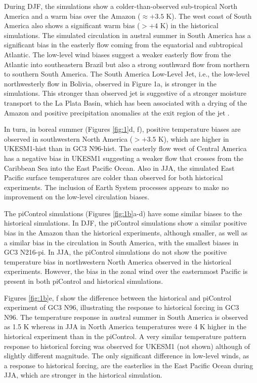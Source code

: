  During DJF, the simulations show a colder-than-observed sub-tropical North America and a warm bias over the Amazon ($\approx +3.5$ K).
 The west coast of South America also shows a significant warm bias ($>+4$ K) in the historical simulations.
 The simulated circulation in austral summer in South America has a significant bias in the easterly flow coming from the equatorial and subtropical Atlantic.
 The low-level wind biases suggest a weaker easterly flow from the Atlantic into southeastern Brazil but also a strong southward flow from northern to southern South America.
  The South America Low-Level Jet, i.e., the low-level northwesterly flow in Bolivia, observed in Figure 1a, is stronger in the simulations.
   This stronger than observed jet is suggestive of a stronger moisture transport to the La Plata Basin, which has been associated with a drying of the Amazon and positive precipitation anomalies at the exit region of the jet \citep{marengo2012,jones2017}.


In turn, in boreal summer (Figures \ref{fig:1}d, f), positive temperature biases are observed in southwestern North America ($>+3.5 $ K), which are higher in UKESM1-hist than in GC3 N96-hist.
 The easterly flow west of Central America has a negative bias in UKESM1 suggesting a weaker flow that crosses from the Caribbean Sea into the East Pacific Ocean.
 Also in JJA, the simulated East Pacific surface temperatures are colder than observed for both historical experiments.      The inclusion of Earth System processes appears to make no  improvement on the low-level circulation biases. 

The piControl simulations (Figures \ref{fig:1b}a-d) have some similar biases to the historical simulations.
 In DJF, the piControl simulations show a similar positive bias in the Amazon than the historical experiments, although smaller, as well as a similar bias in the circulation in South America, with the smallest biases in GC3 N216-pi.
 In JJA, the piControl simulations do not show the positive temperature bias in northwestern North America observed in the historical experiments. However, the bias in the zonal wind over the easternmost Pacific is present in both piControl and historical simulations.
 
 Figures \ref{fig:1b}e, f show the difference between the historical and piControl experiment of GC3 N96, illustrating the response to historical forcing in GC3 N96.
 The temperature response in austral summer in South America is observed as 1.5 K whereas in JJA in North America temperatures were 4 K higher in the historical experiment than in the piControl.
 A very similar temperature pattern response to historical forcing was observed for UKESM1 (not shown) although of slightly different magnitude. The only significant difference in low-level winds, as a response to historical forcing, are the easterlies in the East Pacific Ocean during JJA, which are stronger in the historical simulation. %


